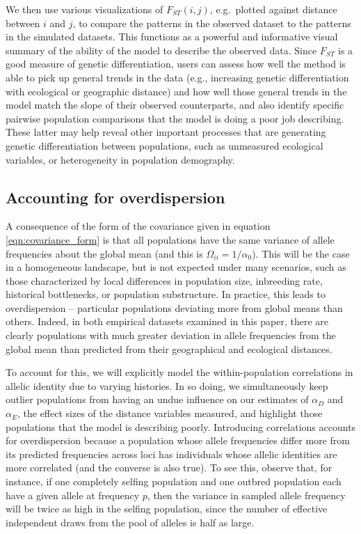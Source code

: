 We then use various visualizations of $F_{ST}(i,j)$, e.g.~plotted against distance between $i$ and $j$, to compare the patterns in the observed dataset to the patterns in the simulated datasets.  This functions as a powerful and informative visual summary of the ability of the model to describe the observed data.  Since $F_{ST}$ is a good measure of genetic differentiation, users can assess how well the method is able to pick up general trends in the data (e.g., increasing genetic differentiation with ecological or geographic distance) and how well those general trends in the model match the slope of their observed counterparts, and also identify specific pairwise population comparisons that the model is doing a poor job describing.  These latter may help reveal other important processes that are generating genetic differentiation between populations, such as unmeasured ecological variables, or heterogeneity in population demography.  

\subsection*{Accounting for overdispersion}

A consequence of the form of the covariance given in equation \eqref{eqn:covariance_form} is that all populations have the same variance of allele frequencies about the global mean
(and this is $\Omega_{ii}=1/\alpha_0$).
This will be the case in a homogeneous landscape,
but is not expected under many scenarios, such as those characterized by local differences in population size, inbreeding rate, historical bottlenecks, or population substructure.
In practice, this leads to overdispersion -- particular populations deviating more from global means than others.
Indeed, in both empirical datasets examined in this paper, there are clearly populations 
with much greater deviation in allele frequencies from the global mean
than predicted from their geographical and ecological distances.

To account for this, we will explicitly model the within-population correlations in allelic identity due to varying histories.
In so doing, we simultaneously keep outlier populations from having an undue influence on our estimates of $\alpha_D$ and $\alpha_E$, 
the effect sizes of the distance variables measured, and highlight those populations that the model is describing poorly.
Introducing correlations accounts for overdispersion because a population whose allele frequencies differ more from its predicted frequencies across loci
has individuals whose allelic identities are more correlated (and the converse is also true).
To see this, observe that, for instance, if one completely selfing population and one outbred population each have a given allele at frequency $p$, then the variance in sampled allele frequency will be twice as high in the selfing population,
since the number of effective independent draws from the pool of alleles is half as large.

